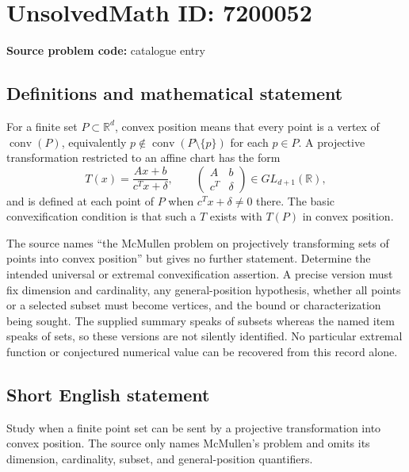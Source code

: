 \documentclass[11pt]{article}
\begin{document}
\section*{UnsolvedMath ID: 7200052}
\textbf{Source problem code:} catalogue entry
\subsection{Definitions and mathematical statement}
For a finite set $P\subset\mathbb R^d$, convex position means that every point is a vertex of $\operatorname{conv}(P)$, equivalently $p\notin\operatorname{conv}(P\setminus\{p\})$ for each $p\in P$. A projective transformation restricted to an affine chart has the form
\[
T(x)=\frac{Ax+b}{c^Tx+\delta},\qquad
\begin{pmatrix}A&b\\c^T&\delta\end{pmatrix}\in GL_{d+1}(\mathbb R),
\]
and is defined at each point of $P$ when $c^Tx+\delta\ne0$ there. The basic convexification condition is that such a $T$ exists with $T(P)$ in convex position.

The source names ``the McMullen problem on projectively transforming sets of points into convex position'' but gives no further statement. Determine the intended universal or extremal convexification assertion. A precise version must fix dimension and cardinality, any general-position hypothesis, whether all points or a selected subset must become vertices, and the bound or characterization being sought. The supplied summary speaks of subsets whereas the named item speaks of sets, so these versions are not silently identified. No particular extremal function or conjectured numerical value can be recovered from this record alone.
\subsection{Short English statement}
Study when a finite point set can be sent by a projective transformation into convex position. The source only names McMullen's problem and omits its dimension, cardinality, subset, and general-position quantifiers.
\end{document}
